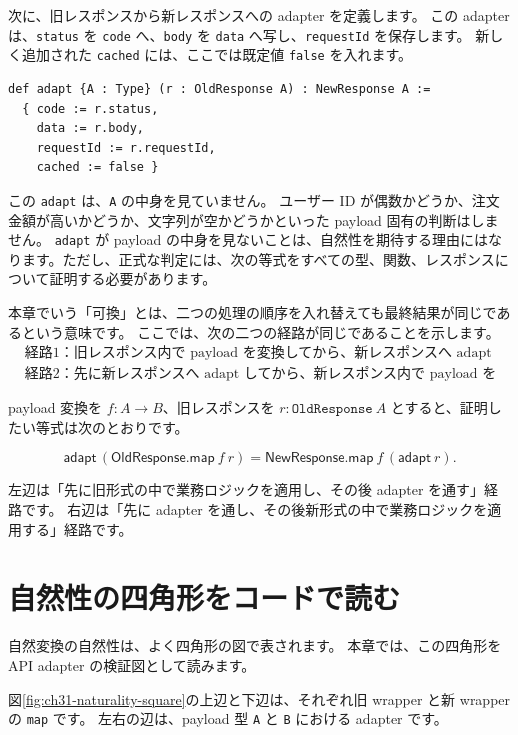 次に、旧レスポンスから新レスポンスへの adapter を定義します。
この adapter は、\texttt{status} を \texttt{code} へ、\texttt{body} を \texttt{data} へ写し、\texttt{requestId} を保存します。
新しく追加された \texttt{cached} には、ここでは既定値 \texttt{false} を入れます。

\begin{listing}[htbp]
\begin{verbatim}
def adapt {A : Type} (r : OldResponse A) : NewResponse A :=
  { code := r.status,
    data := r.body,
    requestId := r.requestId,
    cached := false }
\end{verbatim}
\caption{\texttt{adapt}}
\label{lst:ch31-adapter}
\end{listing}

この \texttt{adapt} は、\texttt{A} の中身を見ていません。
ユーザー ID が偶数かどうか、注文金額が高いかどうか、文字列が空かどうかといった payload 固有の判断はしません。
\texttt{adapt} が payload の中身を見ないことは、自然性を期待する理由にはなります。ただし、正式な判定には、次の等式をすべての型、関数、レスポンスについて証明する必要があります。

本章でいう「可換」とは、二つの処理の順序を入れ替えても最終結果が同じであるという意味です。
ここでは、次の二つの経路が同じであることを示します。
\begin{align*}
&\text{経路1：旧レスポンス内で payload を変換してから、新レスポンスへ adapt します。}\\
&\text{経路2：先に新レスポンスへ adapt してから、新レスポンス内で payload を変換します。}
\end{align*}

payload 変換を \(f : A \to B\)、旧レスポンスを \(r : \texttt{OldResponse}\ A\) とすると、証明したい等式は次のとおりです。

\[
\mathsf{adapt}\,(\mathsf{OldResponse.map}\ f\ r)
=
\mathsf{NewResponse.map}\ f\,(\mathsf{adapt}\ r).
\]

左辺は「先に旧形式の中で業務ロジックを適用し、その後 adapter を通す」経路です。
右辺は「先に adapter を通し、その後新形式の中で業務ロジックを適用する」経路です。

\section{自然性の四角形をコードで読む}

自然変換の自然性は、よく四角形の図で表されます。
本章では、この四角形を API adapter の検証図として読みます。

図\ref{fig:ch31-naturality-square}の上辺と下辺は、それぞれ旧 wrapper と新 wrapper の \texttt{map} です。
左右の辺は、payload 型 \texttt{A} と \texttt{B} における adapter です。

